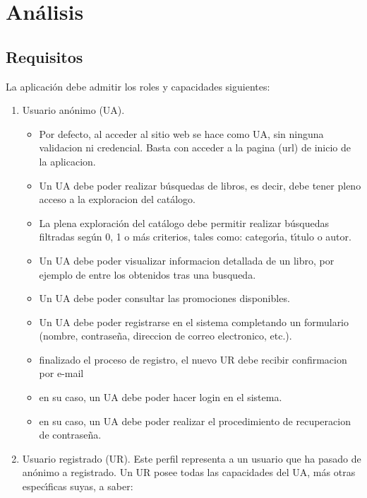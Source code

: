 \documentclass[a4paper]{report}
\begin{document}
    \section{Análisis}

        \subsection{Requisitos}

            La aplicaci\'on debe admitir los roles y capacidades siguientes:
            \begin{enumerate}
                \item Usuario an\'onimo (UA).
                \begin{itemize}
                    \item Por defecto, al acceder al sitio web se hace como UA, sin ninguna validacion ni credencial. Basta con acceder a la pagina (url) de inicio de la aplicacion.
                    \item Un UA debe poder realizar b\'usquedas de libros, es decir, debe tener pleno acceso a la exploracion del cat\'alogo.
                    \item La plena exploraci\'on del cat\'alogo debe permitir realizar b\'usque\-das filtradas seg\'un 0, 1 o m\'as criterios, tales como: categor\'\i{}a, t\'\i{}tulo o autor.
                    \item Un UA debe poder visualizar informacion detallada de un libro, por ejemplo de entre los obtenidos tras una busqueda.
                    \item Un UA debe poder consultar las promociones disponibles.
                    \item Un UA debe poder registrarse en el sistema completando un formulario (nombre, contrase\~na, direccion de correo electronico, etc.).
                    \item finalizado el proceso de registro, el nuevo UR debe recibir confirmacion por e-mail
                    \item en su caso, un UA debe poder hacer login en el sistema.
                    \item en su caso, un UA debe poder realizar el procedimiento de recuperacion de contrase\~na.
                \end{itemize}
                \item Usuario registrado (UR). Este perfil representa a un usuario que ha pasado de an\'onimo a registrado. Un UR posee todas las capacidades del UA, m\'as otras espec\'\i{}ficas suyas, a saber:

\end{enumerate}
\end{document}
